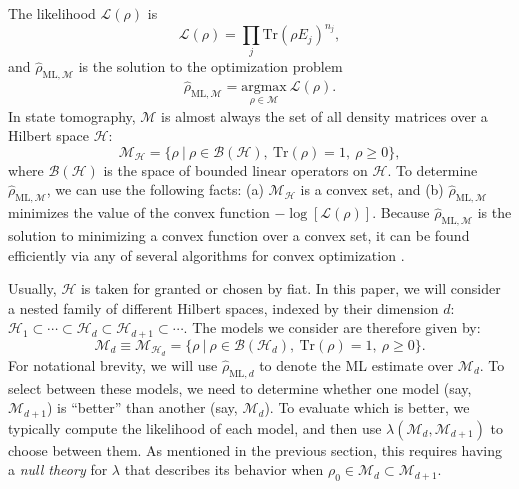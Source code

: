 \documentclass[aps,pra, twocolumn]{revtex4-1}
\newcommand{\M}{\mathcal{M}}
\newcommand{\cH}{\mathcal{H}}
\newcommand{\rhohat}{\hat{\rho}}
\newcommand{\rhoML}[1]{\rhohat_{\scriptscriptstyle{\mathrm{ML},#1}}}
\begin{document}
The likelihood $\mathcal{L}(\rho)$ is
\begin{equation}
\mathcal{L}(\rho) = \prod_{j}\mathrm{Tr}(\rho E_{j})^{n_{j}},
\end{equation}
and $\rhoML{\M}$ is the solution to the optimization problem
\begin{equation}
\label{eq:mle}
\rhoML{\M} = \underset{\rho \in \M}{\text{argmax}}~\mathcal{L}(\rho).
\end{equation}
In state tomography, $\M$ is almost always the set of all density matrices over a Hilbert space $\cH$:
\begin{equation}
\mathcal{M}_{\cH} = \{\rho~|~\rho \in \mathcal{B}(\mathcal{H}),~\mathrm{Tr}(\rho) =1,~\rho \geq 0\},
\end{equation}
where $\mathcal{B}(\cH)$ is the space of bounded linear operators on $\cH$.  To determine $\rhoML{\M}$, we can use the following facts: (a) $\M_{\cH}$ is a convex set, and (b) $\rhoML{\M}$ minimizes the value of the convex function $-\log[\mathcal{L}(\rho)]$. Because $\rhoML{\M}$ is the solution to minimizing a convex function  over a convex set, it can be found efficiently via any of several algorithms for convex optimization \cite{Boyd}.

Usually, $\cH$ is taken for granted or chosen by fiat.  In this paper, we will consider a nested family of different Hilbert spaces, indexed by their dimension $d$: $\cH_{1}  \subset \cdots \subset \cH_{d} \subset \cH_{d+1} \subset \cdots$.  The models we consider are therefore given by:
\begin{equation}
\label{eq:modelsd}
\M_{d} \equiv \mathcal{M}_{\cH_{d}} = \{\rho~|~\rho \in \mathcal{B}(\mathcal{H}_{d}),~\mathrm{Tr}(\rho) =1,~\rho \geq 0\}.
\end{equation}
For notational brevity, we will use $\rhoML{d}$ to denote the ML estimate over $\M_{d}$. To select between these models, we need to determine whether one model (say, $\M_{d + 1}$) is ``better'' than another (say, $\M_{d}$).  To evaluate which is better, we typically compute the likelihood of each model, and then use $\lambda(\M_{d}, \M_{d+1})$ to choose between them. As mentioned in the previous section, this requires having a \emph{null theory} for $\lambda$ that describes its behavior when $\rho_{0} \in \M_{d} \subset \M_{d + 1}$.
\end{document}
